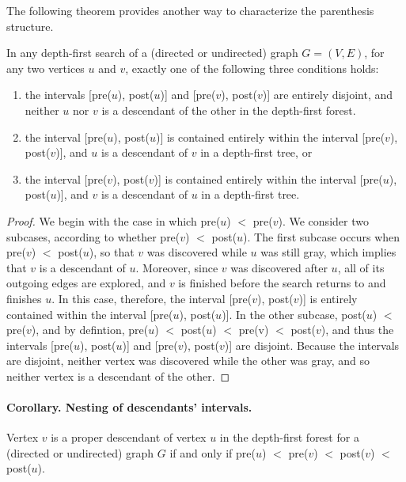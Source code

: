 The following theorem provides another way to characterize the parenthesis structure.

\begin{claim}
In any depth-first search of a (directed or undirected) graph $G = (V, E)$, for any two vertices $u$ and $v$, exactly one of the following three conditions holds:

\begin{enumerate}
  \item the intervals [pre($u$), post($u$)] and [pre($v$), post($v$)] are entirely disjoint, and neither $u$ nor $v$ is a descendant of the other in the depth-first forest.
  \item the interval [pre($u$), post($u$)] is contained entirely within the interval [pre($v$), post($v$)], and $u$ is a descendant of $v$ in a depth-first tree, or
  \item the interval [pre($v$), post($v$)] is contained entirely within the interval [pre($u$), post($u$)], and $v$ is a descendant of $u$ in a depth-first tree.
  \end{enumerate}
\end{claim}

\begin{proof} We begin with the case in which pre($u$) $<$ pre($v$). We consider two subcases, according to whether pre($v$) $<$ post($u$). The first subcase occurs when pre($v$) $<$ post($u$), so that $v$ was discovered while $u$ was still gray, which implies that $v$ is a descendant of $u$. Moreover, since $v$ was discovered after $u$, all of its outgoing edges are explored, and $v$ is finished before the search returns to and finishes $u$. In this case, therefore, the interval [pre($v$), post($v$)] is entirely contained within the interval [pre($u$), post($u$)]. In the other subcase, post($u$) $<$ pre($v$), and by defintion, pre($u$) $<$ post($u$) $<$ pre(v) $<$ post($v$), and thus the intervals [pre($u$), post($u$)] and [pre($v$), post($v$)] are disjoint. Because the intervals are disjoint, neither vertex was discovered while the other was gray, and so neither vertex is a descendant of the other.
\end{proof}


\paragraph{  Corollary. Nesting of descendants' intervals.}
  Vertex $v$ is a proper descendant of vertex $u$ in the depth-first forest for a (directed or undirected) graph $G$ if and only if pre($u$) $<$ pre($v$) $<$ post($v$) $<$ post($u$).
\fi




